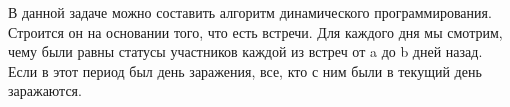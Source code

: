 \solutionSection

В данной задаче можно составить алгоритм динамического программирования. Строится он на основании того, что есть встречи. Для каждого дня мы смотрим, чему были равны статусы участников каждой из встреч от a до b дней назад. Если в этот период был день заражения, все, кто с ним были в текущий день заражаются. 

\codeExample

